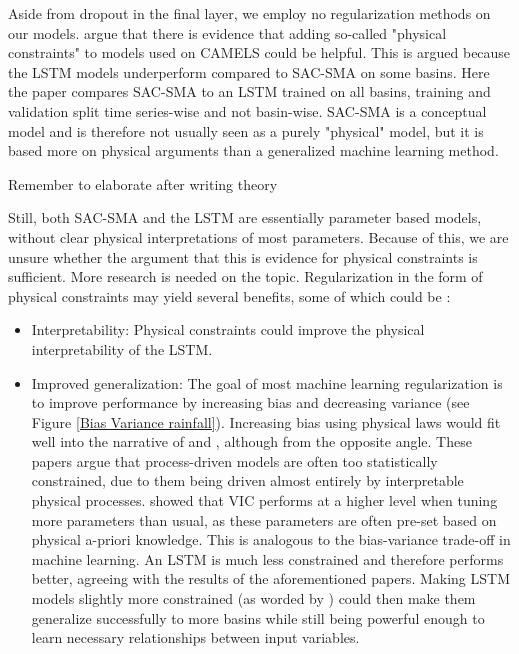 Aside from dropout in the final layer, we employ no regularization methods on 
our models. \citet{lstm_third_paper} 
argue that there is evidence that adding so-called "physical constraints" to 
models used on CAMELS could be helpful. This is argued because the LSTM models 
underperform compared to SAC-SMA on some basins. Here the paper compares SAC-SMA 
to an LSTM trained on all basins, training and validation split time series-wise 
and not basin-wise. SAC-SMA is a conceptual model and is therefore not usually seen 
as a purely "physical" model, but it is based more on physical arguments than a 
generalized machine learning method.
\begin{Huge}
    Remember to elaborate after writing theory
\end{Huge}
Still, both SAC-SMA and the LSTM are essentially 
parameter based models, without clear physical interpretations of most parameters. 
Because of this, we are unsure whether the argument that this is evidence for physical 
constraints is sufficient. More research is needed on the topic. Regularization in 
the form of physical constraints may yield several benefits, some of which could be
\citep{hybrid_paper}:
\begin{itemize}
\item Interpretability: Physical constraints could improve the physical interpretability 
of the LSTM.
\item Improved generalization: The goal of most machine learning regularization is 
to improve performance by increasing bias and decreasing variance (see Figure 
\ref{Bias Variance rainfall}). Increasing bias using physical laws would fit well 
into the narrative of \citet{BiasVarianceVIC} and \citet{VICbench}, although from 
the opposite angle. These papers argue that process-driven models are often too 
statistically constrained, due to them being driven almost entirely by interpretable 
physical processes. \citet{VICbench} showed that VIC performs at a higher level 
when tuning more parameters than usual, as these parameters are often pre-set based 
on physical a-priori knowledge. This is analogous to the bias-variance trade-off 
in machine learning. An LSTM is much less constrained and therefore performs better, 
agreeing with the results of the aforementioned papers. Making LSTM models 
slightly more constrained (as worded by \citet{BiasVarianceVIC}) could then make 
them generalize successfully to more basins while still being powerful enough to 
learn necessary relationships between input variables.
\end{itemize}
